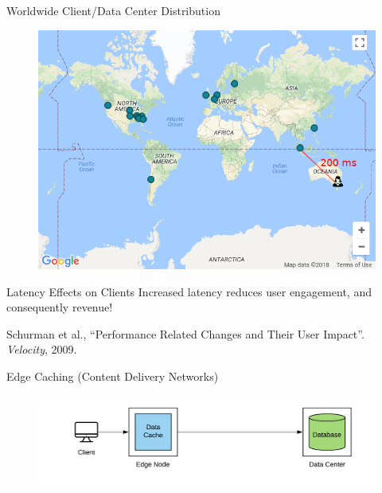\documentclass[12pt]{beamer}
\begin{document}
\begin{frame}{Worldwide Client/Data Center Distribution}
    \begin{figure}
        \center
        \includegraphics[scale=0.45]{apollo_google_oceania}
    \end{figure}
\end{frame}

\begin{frame}{Latency Effects on Clients}
    Increased latency reduces \alert{user engagement}, and consequently \alert{revenue}! \\
    \vspace{1cm}

    \small{Schurman et al., ``Performance Related Changes and Their User Impact''. \emph{Velocity}, 2009.}
\end{frame}

\begin{frame}{Edge Caching (Content Delivery Networks)}
    \begin{figure}
        \center
        \hspace*{-1.5cm}
        \includegraphics[scale=0.17]{apollo_edge_cache}
    \end{figure}
\end{frame}
\end{document}
